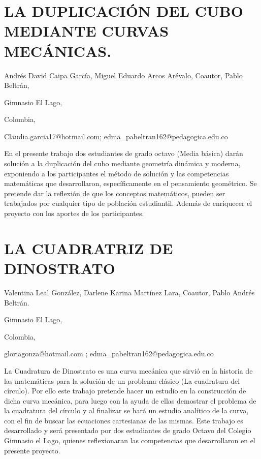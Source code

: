 \section{LA DUPLICACIÓN DEL CUBO MEDIANTE CURVAS MECÁNICAS.}

\begin{datos}

Andrés David Caipa García, Miguel Eduardo Arcos Arévalo, Coautor,
Pablo Beltrán,

Gimnasio El Lago,

Colombia,

Claudia.garcia17@hotmail.com; edma\_pabeltran162@pedagogica.edu.co

\end{datos}

En el presente trabajo dos estudiantes de grado octavo (Media básica)
darán solución a la duplicación del cubo mediante geometría dinámica
y moderna, exponiendo a los participantes el método de solución y
las competencias matemáticas que desarrollaron, específicamente en
el pensamiento geométrico. Se pretende dar la reflexión de que los
conceptos matemáticos, pueden ser trabajados por cualquier tipo de
población estudiantil. Además de enriquecer el proyecto con los aportes
de los participantes.


\section{LA CUADRATRIZ DE DINOSTRATO}

\begin{datos}

Valentina Leal González, Darlene Karina Martínez Lara, Coautor, Pablo
Andrés Beltrán.

Gimnasio El Lago,

Colombia,

gloriagonza@hotmail.com ; edma\_pabeltran162@pedagogica.edu.co

\end{datos}

La Cuadratura de Dinostrato es una curva mecánica que sirvió en la
historia de las matemáticas para la solución de un problema clásico
(La cuadratura del círculo). Por ello este trabajo pretende hacer
un estudio en la construcción de dicha curva mecánica, para luego
con la ayuda de ellas demostrar el problema de la cuadratura del círculo
y al finalizar se hará un estudio analítico de la curva, con el fin
de buscar las ecuaciones cartesianas de las mismas. Este trabajo es
desarrollado y será presentado por dos estudiantes de grado Octavo
del Colegio Gimnasio el Lago, quienes reflexionaran las competencias
que desarrollaron en el presente proyecto. 


